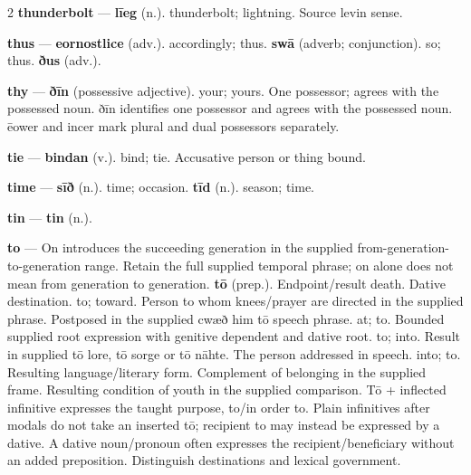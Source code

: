 \begin{multicols}{2}
\textbf{thunderbolt} — \textbf{līeg} (n.). thunderbolt; lightning. Source levin sense.\par
\textbf{thus} — \textbf{eornostlice} (adv.). accordingly; thus. \textbf{swā} (adverb; conjunction). so; thus. \textbf{ðus} (adv.).\par
\textbf{thy} — \textbf{ðīn} (possessive adjective). your; yours. One possessor; agrees with the possessed noun. ðīn identifies one possessor and agrees with the possessed noun. ēower and incer mark plural and dual possessors separately.\par
\textbf{tie} — \textbf{bindan} (v.). bind; tie. Accusative person or thing bound.\par
\textbf{time} — \textbf{sīð} (n.). time; occasion. \textbf{tīd} (n.). season; time.\par
\textbf{tin} — \textbf{tin} (n.).\par
\textbf{to} — On introduces the succeeding generation in the supplied from-generation-to-generation range. Retain the full supplied temporal phrase; on alone does not mean from generation to generation. \textbf{tō} (prep.). Endpoint/result death. Dative destination. to; toward. Person to whom knees/prayer are directed in the supplied phrase. Postposed in the supplied cwæð him tō speech phrase. at; to. Bounded supplied root expression with genitive dependent and dative root. to; into. Result in supplied tō lore, tō sorge or tō nāhte. The person addressed in speech. into; to. Resulting language/literary form. Complement of belonging in the supplied frame. Resulting condition of youth in the supplied comparison. Tō + inflected infinitive expresses the taught purpose, to/in order to. Plain infinitives after modals do not take an inserted tō; recipient to may instead be expressed by a dative. A dative noun/pronoun often expresses the recipient/beneficiary without an added preposition. Distinguish destinations and lexical government.\par

\end{multicols}
